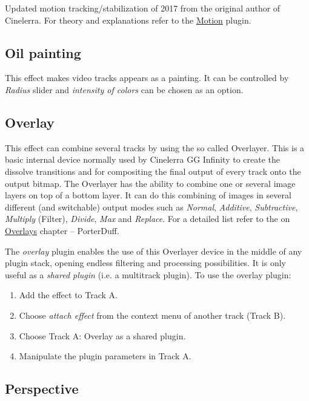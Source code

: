 Updated motion tracking/stabilization of 2017 from the original author of Cinelerra. For theory and explanations refer to the \hyperref[sub:motion]{Motion} plugin.

\subsection{Oil painting}%
\label{sub:oil_painting}

This effect makes video tracks appears as a painting. It can be controlled by \textit{Radius} slider and \textit{intensity of colors} can be chosen as an option.

\subsection{Overlay}%
\label{sub:overlay}

This effect can combine several tracks by using the so called Overlayer. This is a basic internal device normally used by Cinelerra GG Infinity to create the dissolve transitions and for compositing the final output of every track onto the output bitmap. The Overlayer has the ability to combine one or several image layers on top of a bottom layer. It can do this combining of images in several different (and switchable) output modes such as \textit{Normal}, \textit{Additive}, \textit{Subtractive}, \textit{Multiply} (Filter), \textit{Divide}, \textit{Max} and \textit{Replace}. For a detailed list refer to the on \hyperref[cha:overlays]{Overlays} chapter  -- PorterDuff.

The \textit{overlay} plugin enables the use of this Overlayer device in the middle of any plugin stack, opening endless filtering and processing possibilities. It is only useful as a \textit{shared plugin} (i.e. a multitrack plugin). To use the overlay plugin:

\begin{enumerate}
    \item Add the effect to Track A.
    \item Choose \textit{attach effect} from the context menu of another track (Track B).
    \item Choose Track A: Overlay as a shared plugin.
    \item Manipulate the plugin parameters in Track A.
\end{enumerate}

\subsection{Perspective}%
\label{sub:perspective}

